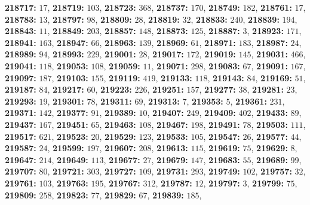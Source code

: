 \textsf{\bfseries 218717:} $17$, \textsf{\bfseries 218719:} $103$, \textsf{\bfseries 218723:} $368$, \textsf{\bfseries 218737:} $170$, \textsf{\bfseries 218749:} $182$, \textsf{\bfseries 218761:} $17$, \textsf{\bfseries 218783:} $13$, \textsf{\bfseries 218797:} $98$, \textsf{\bfseries 218809:} $28$, \textsf{\bfseries 218819:} $32$, \textsf{\bfseries 218833:} $240$, \textsf{\bfseries 218839:} $194$, \textsf{\bfseries 218843:} $11$, \textsf{\bfseries 218849:} $203$, \textsf{\bfseries 218857:} $148$, \textsf{\bfseries 218873:} $125$, \textsf{\bfseries 218887:} $3$, \textsf{\bfseries 218923:} $171$, \textsf{\bfseries 218941:} $163$, \textsf{\bfseries 218947:} $66$, \textsf{\bfseries 218963:} $139$, \textsf{\bfseries 218969:} $61$, \textsf{\bfseries 218971:} $183$, \textsf{\bfseries 218987:} $24$, \textsf{\bfseries 218989:} $94$, \textsf{\bfseries 218993:} $229$, \textsf{\bfseries 219001:} $28$, \textsf{\bfseries 219017:} $172$, \textsf{\bfseries 219019:} $145$, \textsf{\bfseries 219031:} $466$, \textsf{\bfseries 219041:} $118$, \textsf{\bfseries 219053:} $108$, \textsf{\bfseries 219059:} $11$, \textsf{\bfseries 219071:} $298$, \textsf{\bfseries 219083:} $67$, \textsf{\bfseries 219091:} $167$, \textsf{\bfseries 219097:} $187$, \textsf{\bfseries 219103:} $155$, \textsf{\bfseries 219119:} $419$, \textsf{\bfseries 219133:} $118$, \textsf{\bfseries 219143:} $84$, \textsf{\bfseries 219169:} $51$, \textsf{\bfseries 219187:} $84$, \textsf{\bfseries 219217:} $60$, \textsf{\bfseries 219223:} $226$, \textsf{\bfseries 219251:} $157$, \textsf{\bfseries 219277:} $38$, \textsf{\bfseries 219281:} $23$, \textsf{\bfseries 219293:} $19$, \textsf{\bfseries 219301:} $78$, \textsf{\bfseries 219311:} $69$, \textsf{\bfseries 219313:} $7$, \textsf{\bfseries 219353:} $5$, \textsf{\bfseries 219361:} $231$, \textsf{\bfseries 219371:} $142$, \textsf{\bfseries 219377:} $91$, \textsf{\bfseries 219389:} $10$, \textsf{\bfseries 219407:} $249$, \textsf{\bfseries 219409:} $402$, \textsf{\bfseries 219433:} $89$, \textsf{\bfseries 219437:} $167$, \textsf{\bfseries 219451:} $65$, \textsf{\bfseries 219463:} $108$, \textsf{\bfseries 219467:} $198$, \textsf{\bfseries 219491:} $78$, \textsf{\bfseries 219503:} $111$, \textsf{\bfseries 219517:} $621$, \textsf{\bfseries 219523:} $20$, \textsf{\bfseries 219529:} $123$, \textsf{\bfseries 219533:} $105$, \textsf{\bfseries 219547:} $26$, \textsf{\bfseries 219577:} $44$, \textsf{\bfseries 219587:} $24$, \textsf{\bfseries 219599:} $197$, \textsf{\bfseries 219607:} $208$, \textsf{\bfseries 219613:} $115$, \textsf{\bfseries 219619:} $75$, \textsf{\bfseries 219629:} $8$, \textsf{\bfseries 219647:} $214$, \textsf{\bfseries 219649:} $113$, \textsf{\bfseries 219677:} $27$, \textsf{\bfseries 219679:} $147$, \textsf{\bfseries 219683:} $55$, \textsf{\bfseries 219689:} $99$, \textsf{\bfseries 219707:} $80$, \textsf{\bfseries 219721:} $303$, \textsf{\bfseries 219727:} $109$, \textsf{\bfseries 219731:} $293$, \textsf{\bfseries 219749:} $102$, \textsf{\bfseries 219757:} $32$, \textsf{\bfseries 219761:} $103$, \textsf{\bfseries 219763:} $195$, \textsf{\bfseries 219767:} $312$, \textsf{\bfseries 219787:} $12$, \textsf{\bfseries 219797:} $3$, \textsf{\bfseries 219799:} $75$, \textsf{\bfseries 219809:} $258$, \textsf{\bfseries 219823:} $77$, \textsf{\bfseries 219829:} $67$, \textsf{\bfseries 219839:} $185$, 
